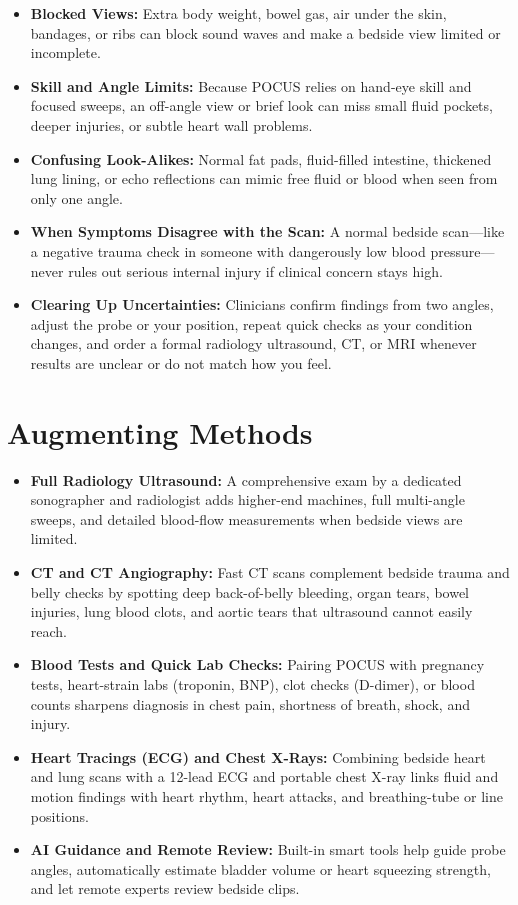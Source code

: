 \begin{itemize}
    \item \textbf{Blocked Views:} Extra body weight, bowel gas, air under the skin, bandages, or ribs can block sound waves and make a bedside view limited or incomplete.
    \item \textbf{Skill and Angle Limits:} Because POCUS relies on hand-eye skill and focused sweeps, an off-angle view or brief look can miss small fluid pockets, deeper injuries, or subtle heart wall problems.
    \item \textbf{Confusing Look-Alikes:} Normal fat pads, fluid-filled intestine, thickened lung lining, or echo reflections can mimic free fluid or blood when seen from only one angle.
    \item \textbf{When Symptoms Disagree with the Scan:} A normal bedside scan---like a negative trauma check in someone with dangerously low blood pressure---never rules out serious internal injury if clinical concern stays high.
    \item \textbf{Clearing Up Uncertainties:} Clinicians confirm findings from two angles, adjust the probe or your position, repeat quick checks as your condition changes, and order a formal radiology ultrasound, CT, or MRI whenever results are unclear or do not match how you feel.
\end{itemize}

\section{Augmenting Methods}

\begin{itemize}
    \item \textbf{Full Radiology Ultrasound:} A comprehensive exam by a dedicated sonographer and radiologist adds higher-end machines, full multi-angle sweeps, and detailed blood-flow measurements when bedside views are limited.
    \item \textbf{CT and CT Angiography:} Fast CT scans complement bedside trauma and belly checks by spotting deep back-of-belly bleeding, organ tears, bowel injuries, lung blood clots, and aortic tears that ultrasound cannot easily reach.
    \item \textbf{Blood Tests and Quick Lab Checks:} Pairing POCUS with pregnancy tests, heart-strain labs (troponin, BNP), clot checks (D-dimer), or blood counts sharpens diagnosis in chest pain, shortness of breath, shock, and injury.
    \item \textbf{Heart Tracings (ECG) and Chest X-Rays:} Combining bedside heart and lung scans with a 12-lead ECG and portable chest X-ray links fluid and motion findings with heart rhythm, heart attacks, and breathing-tube or line positions.
    \item \textbf{AI Guidance and Remote Review:} Built-in smart tools help guide probe angles, automatically estimate bladder volume or heart squeezing strength, and let remote experts review bedside clips.
\end{itemize}

